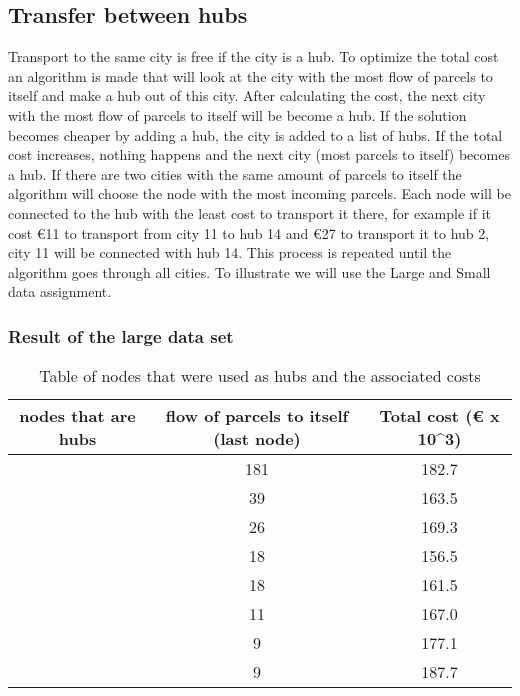 \documentclass{article}
\begin{document}
    \subsection{Transfer between hubs} \label{sssec:num1}
        Transport to the same city is free if the city is a hub. To optimize the total cost an algorithm is made that will look at the city with the most flow of parcels to itself and make a hub out of this city. After calculating the cost, the next city with the most flow of parcels to itself will be become a hub. If the solution becomes cheaper by adding a hub, the city is added to a list of hubs. If the total cost increases, nothing happens and the next city (most parcels to itself) becomes a hub. If there are two cities with the same amount of parcels to itself the algorithm will choose the node with the most incoming parcels. Each node will be connected to the hub with the least cost to transport it there, for example if it cost €11 to transport from city 11 to hub 14 and €27 to transport it to hub 2, city 11 will be connected with hub 14. This process is repeated until the algorithm goes through all cities. To illustrate we will use the Large and Small data assignment.
\subsubsection{Result of the large data set}
        \begin{table}[h!]
            \begin{tabular}{||c|c|c||}
                \hline
                nodes that are hubs & flow of parcels to itself (last node) & Total cost (€ x 10^3)\\
                \hline
                [14] &  181 & 182.7 \\
                \hline
                [14,2]   & 39 & 163.5 \\
                \hline
                [14,2,15] & 26 & 169.3 \\
                \hline
                [14,2,15,6]  & 18 & 156.5 \\
                \hline
                [14,2,15,6,13] & 18 & 161.5\\
                \hline
                [14,2,15,6,13,4] & 11 & 167.0   \\
                \hline
                [14,2,15,6,13,4,3] & 9 & 177.1   \\
                \hline
                [14,2,15,6,13,4,3,9] & 9 & 187.7    \\
                \hline
            \end{tabular}
        \caption{Table of nodes that were used as hubs and the associated costs}
        \end{table}
\end{document}
